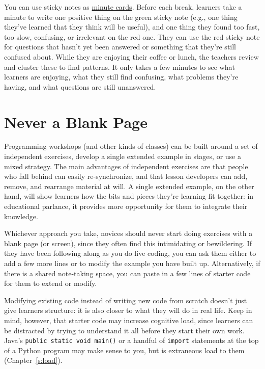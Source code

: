 You can use sticky notes as \protect\hyperlink{g:minute-cards}{minute cards}.
Before each break, learners take a minute to write one positive thing on
the green sticky note (e.g., one thing they've learned that they think
will be useful), and one thing they found too fast, too slow, confusing,
or irrelevant on the red one. They can use the red sticky note for
questions that hasn't yet been answered or something that they're still
confused about. While they are enjoying their coffee or lunch, the
teachers review and cluster these to find patterns. It only takes a few
minutes to see what learners are enjoying, what they still find
confusing, what problems they're having, and what questions are still
unanswered.

\section{Never a Blank Page}\label{s:classroom-blank}

Programming workshops (and other kinds of classes) can be built around a
set of independent exercises, develop a single extended example in
stages, or use a mixed strategy. The main advantages of independent
exercises are that people who fall behind can easily re-synchronize, and
that lesson developers can add, remove, and rearrange material at will.
A single extended example, on the other hand, will show learners how the
bits and pieces they're learning fit together: in educational parlance,
it provides more opportunity for them to integrate their knowledge.

Whichever approach you take, novices should never start doing exercises
with a blank page (or screen), since they often find this intimidating
or bewildering. If they have been following along as you do live coding,
you can ask them either to add a few more lines or to modify the example
you have built up. Alternatively, if there is a shared note-taking
space, you can paste in a few lines of starter code for them to extend
or modify.

Modifying existing code instead of writing new code from scratch doesn't
just give learners structure: it is also closer to what they will do in
real life. Keep in mind, however, that starter code may increase
cognitive load, since learners can be distracted by trying to understand
it all before they start their own work. Java's \texttt{public\ static\ void\ main()} or a handful of \texttt{import} statements at the top of a Python
program may make sense to you, but is extraneous load to them
(Chapter~\ref{s:load}).

